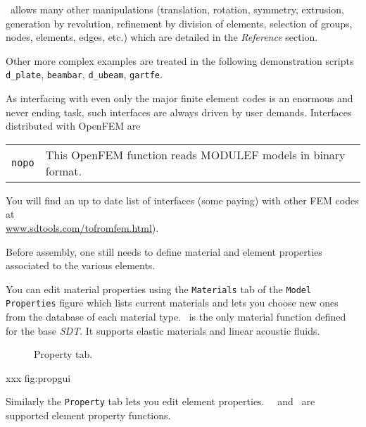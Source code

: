 \femesh\ allows many other manipulations (translation, rotation, 
symmetry, extrusion, generation by revolution, refinement by division 
of elements, selection of groups, nodes, elements, edges, etc.) which 
are detailed in the {\sl Reference} section.

\begin{SDT}
Other more complex examples are treated in the following demonstration scripts {\tt d\_plate}, {\tt beambar}, {\tt d\_ubeam}, {\tt gartfe}.
\end{SDT}

\begin{OPENFEM}

As interfacing with even only the major finite element codes is an enormous and never ending task, such interfaces are always driven by user demands. Interfaces distributed with OpenFEM are

\lvs\noindent\begin{tabular}{@{}p{}@{}p{}@{}}
%
{\tt nopo}  & This OpenFEM function reads MODULEF models in binary format.\\

\end{tabular}

You will find an up to date list of interfaces (some paying) with other FEM codes at\\ \href{http://www.sdtools.com/tofromfem.html}{www.sdtools.com/tofromfem.html}).

\end{OPENFEM}



Before assembly, one still needs to define material and element properties associated to the various elements. 

\begin{SDT}
You can edit material properties using the {\tt Materials} tab of the {\tt Model Properties} figure which lists current materials and lets you choose new ones from the database of each material type. \melastic\ is the only material function defined for the base {\sl SDT}. It supports elastic materials and linear acoustic fluids. 

\begin{figure}[hbt]
\centering
{} %
 \caption{Property tab.}
  \label{fig:matgui}
\end{figure}

xxx fig:propgui

Similarly the {\tt Property} tab lets you edit element properties. \pbeam\, \pshell\ and \pspring\ are supported element property functions.

\end{SDT}

